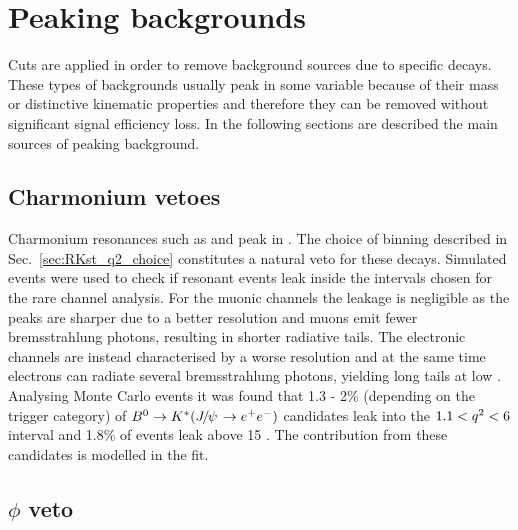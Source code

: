 \section{Peaking backgrounds }

Cuts are applied in order to remove background sources due to specific decays.
These types of backgrounds usually peak in some variable because of their mass
or distinctive kinematic properties and therefore they can be removed without significant
signal efficiency loss. In the following sections are described the main sources of peaking background.

\subsection{Charmonium vetoes}

Charmonium resonances such as \jpsi and \psitwos peak in \qsq.
The choice of \qsq binning described in Sec.~\ref{sec:RKst_q2_choice}
constitutes a natural veto for these decays. Simulated events were used
to check if resonant events leak inside the \qsq intervals chosen for
the rare channel analysis. For the muonic channels the leakage is negligible
as the peaks are sharper due to a better resolution and muons emit fewer
bremsstrahlung photons, resulting in shorter radiative tails.
The electronic channels are instead  characterised by
a worse resolution and at the same time electrons can radiate 
several bremsstrahlung photons, yielding long tails at low \qsq.
Analysing Monte Carlo events it was found that 1.3 - 2\% (depending on
the trigger category) of $\Bz\to\Kstar(\jpsi\to\ee)$ candidates leak into the $1.1 < {q^2} < 6$
\gevgevcccc interval and 1.8\% of \psitwos events leak above 15 \gevgevcccc.
The contribution from these candidates is modelled in the fit. 


\subsection{$\phi$ veto}

